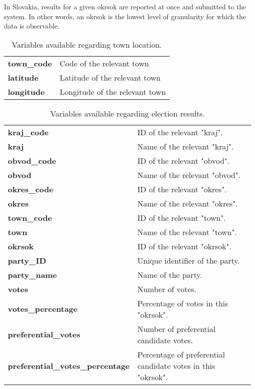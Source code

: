 \documentclass[12pt]{article}
\begin{document}
In Slovakia, results for a given okrsok are reported at once and submitted to the system. In other words, an okrsok is the lowest level of granularity for which the data is observable. 

\begin{table}[h]
	\centering
	\begin{tabularx}{0.7\linewidth}{lX}
		\toprule
		\textbf{town\_code} & Code of the relevant town \\
		\textbf{latitude} & Latitude of the relevant town  \\
		\textbf{longitude} & Longitude of the relevant town  \\
		\bottomrule
	\end{tabularx}
	\caption{Variables available regarding town location.}
	\label{tab:data:location_data:used_variables}
\end{table}

\begin{table}[h]
	\centering
	\begin{tabularx}{\linewidth}{lX}
		\toprule
		\textbf{kraj\_code} & ID of the relevant "kraj". \\
		\textbf{kraj} & Name of the relevant "kraj". \\
		\textbf{obvod\_code} & ID of the relevant "obvod". \\
		\textbf{obvod} & Name of the relevant "obvod". \\
		\textbf{okres\_code} & ID of the relevant "okres". \\		
		\textbf{okres} & Name of the relevant "okres". \\
		\textbf{town\_code} & ID of the relevant "town". \\
		\textbf{town} & Name of the relevant "town". \\
		\textbf{okrsok} & ID of the relevant "okrsok". \\
		\textbf{party\_ID} & Unique identifier of the party. \\
		\textbf{party\_name} & Name of the party. \\
		\textbf{votes} & Number of votes. \\
		\textbf{votes\_percentage} & Percentage of votes in this "okrsok". \\
		\textbf{preferential\_votes} & Number of preferential candidate votes. \\
		\textbf{preferential\_votes\_percentage} & Percentage of preferential candidate votes in this "okrsok".  \\
		\bottomrule
	\end{tabularx}
	\caption{Variables available regarding election results.}
	\label{tab:data:election_data:used_variables}
\end{table}
\end{document}
